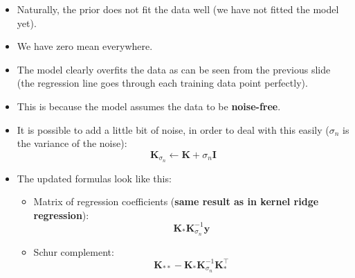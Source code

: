 \begin{frame}
	\begin{itemize}
		\item Naturally, the prior does not fit the data well (we have not fitted the model yet).
		\item We have zero mean everywhere.
	\end{itemize}
\end{frame}


\begin{frame}
\end{frame}


\begin{frame}
	\begin{itemize}
		\item The model clearly overfits the data as can be seen from the previous slide (the regression line goes through each training data point perfectly).
		\item This is because the model assumes the data to be \textbf{noise-free}.
		\item It is possible to add a little bit of noise, in order to deal with this easily ($\sigma_n$ is the variance of the noise):
		\begin{equation}
			\bm{K}_{\sigma_n} \longleftarrow \bm{K} + \sigma_n \bm{I}
		\end{equation}
		\item The updated formulas look like this:
		\begin{itemize}
			\item Matrix of regression coefficients (\textbf{same result as in kernel ridge regression}):
			\begin{equation}
				\bm{K_*} \bm{K}_{\sigma_n}^{-1} \bm{y}
			\end{equation} 
			\item Schur complement:
			\begin{equation}
				\bm{K}_{**} - \bm{K}_* \bm{K}_{\sigma_n}^{-1} \bm{K}_*^{\intercal}
			\end{equation}
		\end{itemize}
	\end{itemize}
\end{frame}


